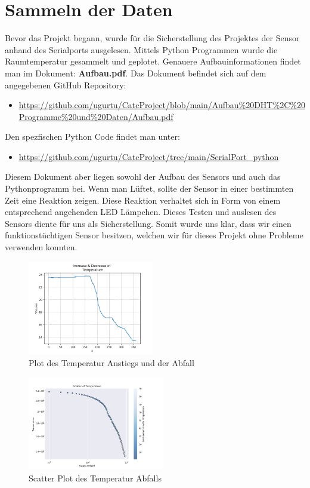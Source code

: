 \documentclass{article}
\begin{document}
\section{Sammeln der Daten}
Bevor das Projekt begann, wurde für die Sicherstellung des Projektes der Sensor anhand des Serialports ausgelesen. Mittels Python Programmen wurde die Raumtemperatur gesammelt und geplotet. Genauere Aufbauinformationen findet man im Dokument:\textbf{ Aufbau.pdf}. Das Dokument befindet sich auf dem angegebenen GitHub Repository: \begin{itemize}
\item \url{https://github.com/ugurtu/CatcProject/blob/main/Aufbau\%20DHT\%2C\%20Programme\%20und\%20Daten/Aufbau.pdf}
\end{itemize} Den spezfischen Python Code findet man unter:
\begin{itemize}
\item  \url{https://github.com/ugurtu/CatcProject/tree/main/SerialPort_python}
\end{itemize}
Diesem Dokument aber liegen sowohl der Aufbau des Sensors und auch das Pythonprogramm bei. Wenn man Lüftet, sollte der Sensor in einer bestimmten Zeit eine Reaktion zeigen. Diese Reaktion verhaltet sich in Form von einem entsprechend angehenden LED Lämpchen. Dieses Testen und auslesen des Sensors diente für uns als Sicherstellung. Somit wurde uns klar, dass wir einen funktionstüchtigen Sensor besitzen, welchen wir für dieses Projekt ohne Probleme verwenden konnten.
\begin{figure}[!h]
\begin{center}
\includegraphics[width=0.49\textwidth]{plot.png}
\caption{Plot des Temperatur Anstiegs und der Abfall}
\label{fig:decrease}
\end{center}
\end{figure}
\begin{figure}[!h]
\begin{center}
\includegraphics[width=0.53\textwidth]{scatter.png}
\caption{Scatter Plot des Temperatur Abfalls}
\label{fig:scatter}
\end{center}
\end{figure}
\end{document}
